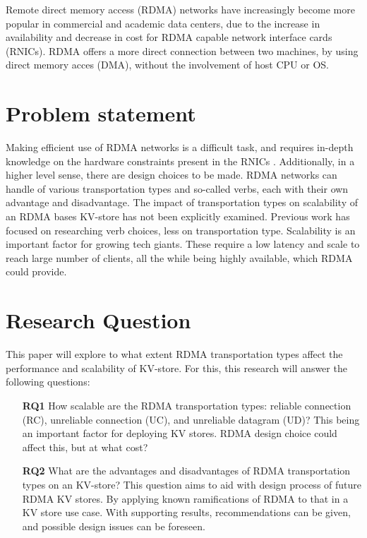 Remote direct memory access (RDMA) networks have increasingly become more popular in commercial and academic data centers, due to the increase in availability and decrease in cost for RDMA capable network interface cards (RNICs)\cite{kalia2016design, chen2019scalable}.
RDMA offers a more direct connection between two machines, by using direct memory acces (DMA), without the involvement of host CPU or OS.

\section{Problem statement}
Making efficient use of RDMA networks is a difficult task, and requires in-depth knowledge on the hardware constraints present in the RNICs \cite{kalia2016design, chen2019scalable}.
Additionally, in a higher level sense, there are design choices to be made.
RDMA networks can handle of various transportation types and so-called verbs, each with their own advantage and disadvantage.
The impact of transportation types on scalability of an RDMA bases KV-store has not been explicitly examined.
Previous work has focused on researching verb choices, less on transportation type\cite{kalia2014using, kalia2016fasst, mitchell2013using}.
Scalability is an important factor for growing tech giants.
These require a low latency and scale to reach large number of clients, all the while being highly available\cite{decandia2007dynamo}, which RDMA could provide.

\section{Research Question}
This paper will explore to what extent RDMA transportation types affect the performance and scalability of KV-store.
For this, this research will answer the following questions:

\begin{itemize}
    \item[\textbf{RQ1}] How scalable are the RDMA transportation types: reliable connection (RC), unreliable connection (UC), and unreliable datagram (UD)?%
    This being an important factor for deploying KV stores.
    RDMA design choice could affect this, but at what cost?
    \item[\textbf{RQ2}] What are the advantages and disadvantages of RDMA transportation types on an KV-store?
    This question aims to aid with design process of future RDMA KV stores.
    By applying known ramifications of RDMA to that in a KV store use case.
    With supporting results, recommendations can be given, and possible design issues can be foreseen.
\end{itemize}

